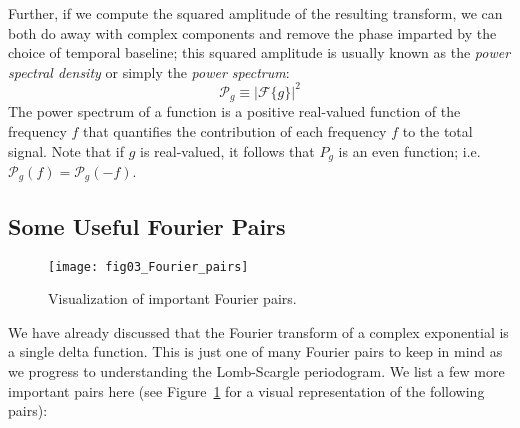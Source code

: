 \documentclass[preprint]{aastex}
\newcommand{\Fig}[1]{Figure~\ref{fig:#1}}
\newcommand{\figlabel}[1]{\label{fig:#1}}
\newcommand{\eqlabel}[1]{\label{eq:#1}}
\begin{document}
Further, if we compute the squared amplitude of the resulting transform, we
can both do away with complex components and remove the phase imparted by
the choice of temporal baseline; this squared amplitude is usually known as the
{\it power spectral density} or simply the {\it power spectrum}:
\begin{equation}
  \mathcal{P}_g \equiv \left|\mathcal{F}\{g\}\right|^2
  \eqlabel{power-spectrum}
\end{equation}
The power spectrum of a function is a positive real-valued function of the
frequency $f$ that quantifies the contribution of each frequency $f$ to
the total signal.
Note that if $g$ is real-valued, it follows that $P_g$ is an even function;
{i.e.} $\mathcal{P}_g(f) = \mathcal{P}_g(-f)$.

\subsection{Some Useful Fourier Pairs}

\begin{figure}[ht]
\centering
\texttt{[image: fig03\_Fourier\_pairs]}
\caption{Visualization of important Fourier pairs.\figlabel{fourier-pairs}}
\end{figure}

We have already discussed that the Fourier transform of a complex exponential is a single delta function.
This is just one of many Fourier pairs to keep in mind as we progress to understanding the Lomb-Scargle periodogram.
We list a few more important pairs here (see \Fig{fourier-pairs} for a visual representation of the following pairs):
\end{document}
